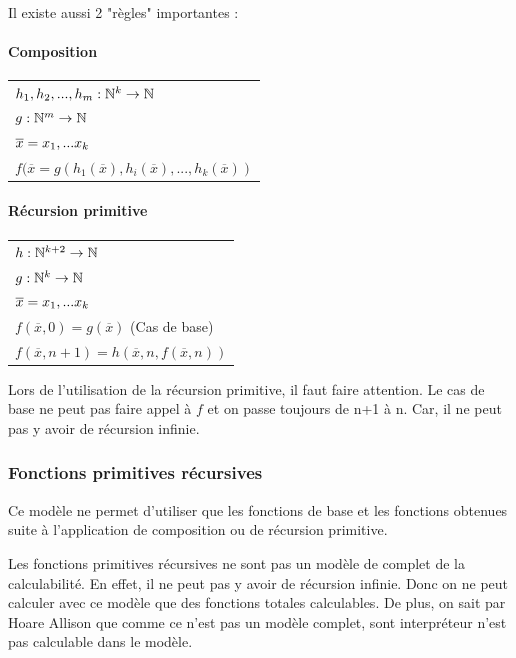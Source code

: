 Il existe aussi 2 "règles" importantes :
\paragraph{Composition}
\begin{tabular}{|l|}
	\hline
	$h_1, h_2,...,h_m: \mathbb{N}^k \rightarrow \mathbb{N}$\\
	$g: \mathbb{N}^m \rightarrow \mathbb{N}$\\
	$\overline{x} =x_1,...x_k$ \\
	$f(\overline{x} = 
	g(h_1(\overline{x}),h_i(\overline{x}),...,h_k(\overline{x}))$\\
	\hline
\end{tabular}

\paragraph{Récursion primitive}
\begin{tabular}{|l|}
	\hline
	$h: \mathbb{N}^{k+2} \rightarrow \mathbb{N}$\\
	$g: \mathbb{N}^k \rightarrow \mathbb{N}$\\
	$\overline{x} =x_1,...x_k$ \\
	$f(\overline{x}, 0) = g(\overline{x})$ (Cas de base)\\
	$f(\overline{x}, n+1) = 
	h(\overline{x},n, f(\overline{x}, n))$\\
	\hline
\end{tabular}

\begin{myrem}
	Lors de l'utilisation de la récursion primitive, il faut faire 
	attention. Le cas de base ne peut pas faire appel à $f$ et on passe 
	toujours de n+1 à n. Car, il ne peut pas y avoir de récursion infinie.
\end{myrem}

\subsubsection{Fonctions primitives récursives}
Ce modèle ne permet d'utiliser que les fonctions de base et les fonctions 
obtenues suite à l'application de composition ou de récursion primitive.

\begin{myprop}
	Les fonctions primitives récursives ne sont pas un modèle de complet de 
	la calculabilité. En effet, il ne peut pas y avoir de récursion 
	infinie. Donc on ne peut calculer avec ce modèle que des fonctions 
	totales calculables. De plus, on sait par Hoare Allison que comme ce 
	n'est pas un modèle complet, sont interpréteur n'est pas calculable 
	dans le modèle.
\end{myprop}


